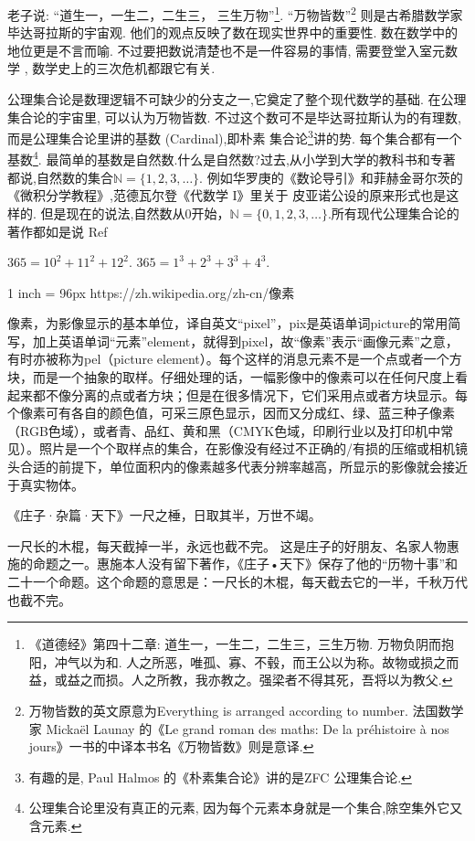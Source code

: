 \documentclass[main.tex]{subfiles}
\begin{document}
老子说: “道生一，一生二，二生三，
三生万物”\footnote{《道德经》第四十二章: 道生一，一生二，二生三，三生万物. 万物负阴而抱阳，冲气以为和. 人之所恶，唯孤、寡、不毂，而王公以为称。故物或损之而益，或益之而损。人之所教，我亦教之。强梁者不得其死，吾将以为教父.}.
“万物皆数”\footnote{万物皆数的英文原意为Everything is arranged according to number. 
	法国数学家 Mickaël Launay 的《Le grand roman des maths: De la préhistoire à nos jours》一书的中译本书名《万物皆数》则是意译.}
则是古希腊数学家毕达哥拉斯的宇宙观. 他们的观点反映了数在现实世界中的重要性. 数在数学中的地位更是不言而喻.
不过要把数说清楚也不是一件容易的事情, 需要登堂入室元数学
, 数学史上的三次危机都跟它有关. 

公理集合论是数理逻辑不可缺少的分支之一,它奠定了整个现代数学的基础. 在公理集合论的宇宙里, 可以认为万物皆数. 
不过这个数可不是毕达哥拉斯认为的有理数, 而是公理集合论里讲的基数 (Cardinal),即朴素
集合论\footnote{有趣的是, Paul Halmos 的《朴素集合论》讲的是ZFC 公理集合论\cite{HalmosP}.}讲的势. 每个集合都有一个
基数\footnote{公理集合论里没有真正的元素,
因为每个元素本身就是一个集合,除空集外它又含元素.}.
最简单的基数是自然数.什么是自然数?过去,从小学到大学的教科书和专著都说,自然数的集合$\mathbb{N} = \{1, 2, 3, \dots\}$.
例如华罗庚的《数论导引》\cite{HuaL}和菲赫金哥尔茨的
《微积分学教程》\cite{FeiH1},范德瓦尔登《代数学 I》\cite{derWaerden}里关于
皮亚诺公设的原来形式也是这样的.
但是现在的说法,自然数从0开始，$\mathbb{N} = \{0,1, 2, 3, \dots\}$.所有现代公理集合论的著作都如是说
Ref
\cite{JiangJi}


$365=10^2+11^2+12^2$.
$365=1^3+2^3+3^3+4^3$.


1 inch = 96px
https://zh.wikipedia.org/zh-cn/像素

像素，为影像显示的基本单位，译自英文“pixel”，pix是英语单词picture的常用简写，加上英语单词“元素”element，就得到pixel，故“像素”表示“画像元素”之意，有时亦被称为pel（picture element）。每个这样的消息元素不是一个点或者一个方块，而是一个抽象的取样。仔细处理的话，一幅影像中的像素可以在任何尺度上看起来都不像分离的点或者方块；但是在很多情况下，它们采用点或者方块显示。每个像素可有各自的颜色值，可采三原色显示，因而又分成红、绿、蓝三种子像素（RGB色域），或者青、品红、黄和黑（CMYK色域，印刷行业以及打印机中常见）。照片是一个个取样点的集合，在影像没有经过不正确的/有损的压缩或相机镜头合适的前提下，单位面积内的像素越多代表分辨率越高，所显示的影像就会接近于真实物体。


《庄子·杂篇·天下》一尺之棰，日取其半，万世不竭。

一尺长的木棍，每天截掉一半，永远也截不完。
这是庄子的好朋友、名家人物惠施的命题之一。惠施本人没有留下著作，《庄子•天下》保存了他的“历物十事”和二十一个命题。这个命题的意思是：一尺长的木棍，每天截去它的一半，千秋万代也截不完。
\end{document}

